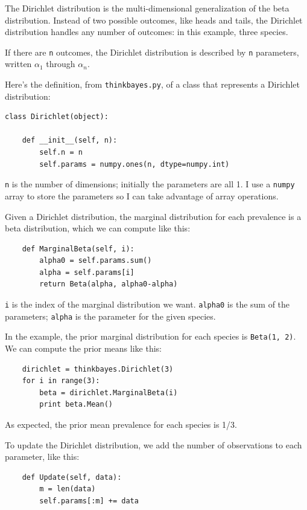 \documentclass[12pt]{book}
\begin{document}
The Dirichlet distribution is the multi-dimensional generalization
of the beta distribution.  Instead of two possible outcomes, like
heads and tails, the Dirichlet distribution handles any number of
outcomes: in this example, three species.

If there are {\tt n} outcomes, the Dirichlet distribution is
described by {\tt n} parameters, written $\alpha_1$ through $\alpha_n$.

Here's the definition, from {\tt thinkbayes.py}, of a class that
represents a Dirichlet distribution:

\begin{verbatim}
class Dirichlet(object):

    def __init__(self, n):
        self.n = n
        self.params = numpy.ones(n, dtype=numpy.int)
\end{verbatim}

{\tt n} is the number of dimensions; initially the parameters
are all 1.  I use a {\tt numpy} array to store the parameters
so I can take advantage of array operations.

Given a Dirichlet distribution, the marginal distribution
for each prevalence is a beta distribution, which we can
compute like this:

\begin{verbatim}
    def MarginalBeta(self, i):
        alpha0 = self.params.sum()
        alpha = self.params[i]
        return Beta(alpha, alpha0-alpha)
\end{verbatim}

{\tt i} is the index of the marginal distribution we want.
{\tt alpha0} is the sum of the parameters; {\tt alpha} is the
parameter for the given species.

In the example, the prior marginal distribution for each species
is {\tt Beta(1, 2)}.  We can compute the prior means like
this:

\begin{verbatim}
    dirichlet = thinkbayes.Dirichlet(3)
    for i in range(3):
        beta = dirichlet.MarginalBeta(i)
        print beta.Mean()
\end{verbatim}

As expected, the prior mean prevalence for each species is 1/3.

To update the Dirichlet distribution, we add the number of
observations to each parameter, like this:

\begin{verbatim}
    def Update(self, data):
        m = len(data)
        self.params[:m] += data
\end{verbatim}
\end{document}
